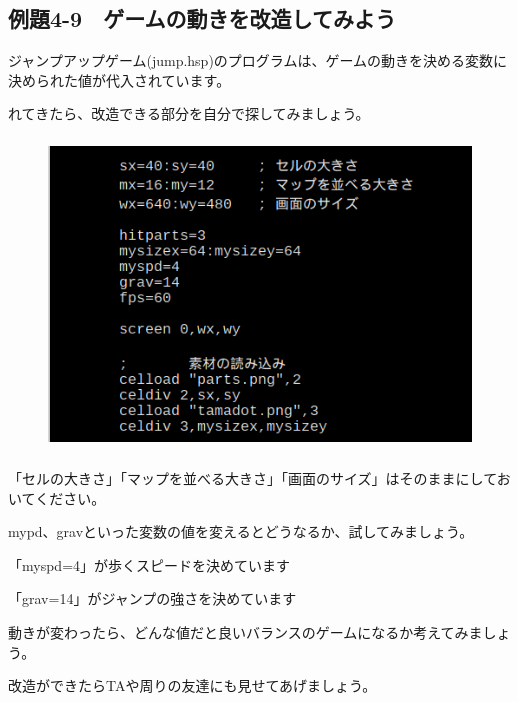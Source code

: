 \newpage
\subsection{例題4-9　ゲームの動きを改造してみよう}

\begin{description}
    \item {}
\end{description}



ジャンプアップゲーム(jump.hsp)のプログラムは、ゲームの動きを決める変数に決められた値が代入されています。

れてきたら、改造できる部分を自分で探してみましょう。



\begin{figure}[H]
    \begin{center}
      \includegraphics[keepaspectratio,width=11.853cm,height=8.266cm]{text04-img/s_jumpsrcpart.png}
    \end{center}
    \label{fig:prog_menu}
\end{figure}


「セルの大きさ」「マップを並べる大きさ」「画面のサイズ」はそのままにしておいてください。

mypd、gravといった変数の値を変えるとどうなるか、試してみましょう。

\begin{description}
    \item {}
\end{description}

「myspd=4」が歩くスピードを決めています

「grav=14」がジャンプの強さを決めています

動きが変わったら、どんな値だと良いバランスのゲームになるか考えてみましょう。

改造ができたらTAや周りの友達にも見せてあげましょう。


